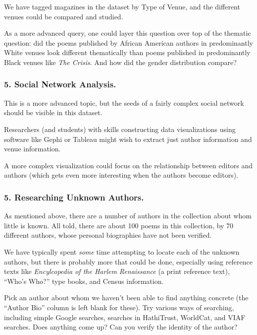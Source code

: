 \documentclass[
  letterpaper,
  DIV=11,
  numbers=noendperiod]{scrartcl}
\begin{document}
We have tagged magazines in the dataset by Type of Venue, and the
different venues could be compared and studied.

As a more advanced query, one could layer this question over top of the
thematic question: did the poems published by African American authors
in predominantly White venues look different thematically than poems
published in predominantly Black venues like \emph{The Crisis}. And how
did the gender distribution compare?

\subsubsection{5. Social Network
Analysis.}\label{social-network-analysis.}

This is a more advanced topic, but the seeds of a fairly complex social
network should be visible in this dataset.

Researchers (and students) with skills constructing data visualizations
using software like Gephi or Tableau might wish to extract just author
information and venue information.

A more complex visualization could focus on the relationship between
editors and authors (which gets even more interesting when the authors
become editors).

\subsubsection{5. Researching Unknown
Authors.}\label{researching-unknown-authors.}

As mentioned above, there are a number of authors in the collection
about whom little is known. All told, there are about 100 poems in this
collection, by 70 different authors, whose personal biographies have not
been verified.

We have typically spent \emph{some} time attempting to locate each of
the unknown authors, but there is probably more that could be done,
especially using reference texts like \emph{Encylcopedia of the Harlem
Renaissance} (a print reference text), ``Who's Who?'' type books, and
Census information.

Pick an author about whom we haven't been able to find anything concrete
(the ``Author Bio'' column is left blank for these). Try various ways of
searching, including simple Google searches, searches in HathiTrust,
WorldCat, and VIAF searches. Does anything come up? Can you verify the
identity of the author?
\end{document}
